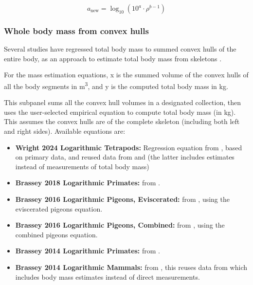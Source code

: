 \documentclass{article}
\begin{document}
\begin{equation}
a_{\text{new}} = \log_{10} \left( 10^a \cdot \rho^{b - 1} \right)
\end{equation}




\subsubsection{Whole body mass from convex hulls}

Several studies have regressed total body mass to summed convex hulls of the entire body, as an approach to estimate total body mass from skeletons \cite{brasseyScalingConvexHull2014,brasseyConvexhullMassEstimates2016,brasseyVolumetricTechniqueFossil2018,wrightVolumetricElementscalingMass2024}. 

For the mass estimation equations, x is the summed volume of the convex hulls of all the body segments in \si{m^3}, and y is the computed total body mass in \si{kg}.

This subpanel sums all the convex hull volumes in a designated collection, then uses the user-selected empirical equation to compute total body mass (in kg). This assumes the convex hulls are of the complete skeleton (including both left and right sides). Available equations are:

\begin{itemize}
    \item \textbf{Wright 2024 Logarithmic Tetrapods:} Regression equation from \cite{wrightVolumetricElementscalingMass2024}, based on primary data, and reused data from \cite{coathamConvexHullEstimation2021} and \cite{sellersMinimumConvexHull2012} (the latter includes estimates instead of measurements of total body mass)
    \item \textbf{Brassey 2018 Logarithmic Primates:} from \cite{brasseyVolumetricTechniqueFossil2018}.
    \item \textbf{Brassey 2016 Logarithmic Pigeons, Eviscerated:} from \cite{brasseyConvexhullMassEstimates2016}, using the eviscerated pigeons equation.
    \item \textbf{Brassey 2016 Logarithmic Pigeons, Combined:} from \cite{brasseyConvexhullMassEstimates2016}, using the combined pigeons equation.
    \item \textbf{Brassey 2014 Logarithmic Primates:} from \cite{brasseyScalingConvexHull2014}.
    \item \textbf{Brassey 2014 Logarithmic Mammals:} from \cite{brasseyScalingConvexHull2014}, this reuses data from \cite{sellersMinimumConvexHull2012} which includes body mass estimates instead of direct measurements.
\end{itemize}
\end{document}
